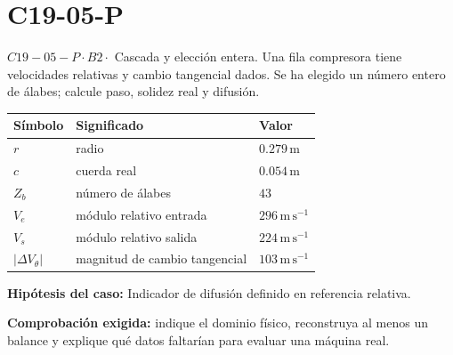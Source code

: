 \documentclass[10pt,openany]{book}
\begin{document}
\section{C19-05-P}
\(C19-05-P \cdot B2 \cdot\) Cascada y elección entera. Una fila compresora tiene velocidades relativas y cambio tangencial dados. Se ha elegido un número entero de álabes; calcule paso, solidez real y difusión.
\begin{center}\begin{tabular}{p{.15\linewidth}p{.42\linewidth}p{.31\linewidth}}\textbf{Símbolo} & \textbf{Significado} & \textbf{Valor}\\\hline
\(r\) & radio & \(0.279\,\mathrm{m}\)\\
\(c\) & cuerda real & \(0.054\,\mathrm{m}\)\\
\(Z_b\) & número de álabes & \(43\)\\
\(V_e\) & módulo relativo entrada & \(296\,\mathrm{m}\,\mathrm{s}^{-1}\)\\
\(V_s\) & módulo relativo salida & \(224\,\mathrm{m}\,\mathrm{s}^{-1}\)\\
\(|\Delta V_\theta|\) & magnitud de cambio tangencial & \(103\,\mathrm{m}\,\mathrm{s}^{-1}\)\\
\end{tabular}\end{center}
\noindent\textbf{Hipótesis del caso:} Indicador de difusión definido en referencia relativa.\par
\noindent\textbf{Comprobación exigida:} indique el dominio físico, reconstruya al menos un balance y explique qué datos faltarían para evaluar una máquina real.\par
\begin{center}\end{center}
\clearpage
\end{document}
